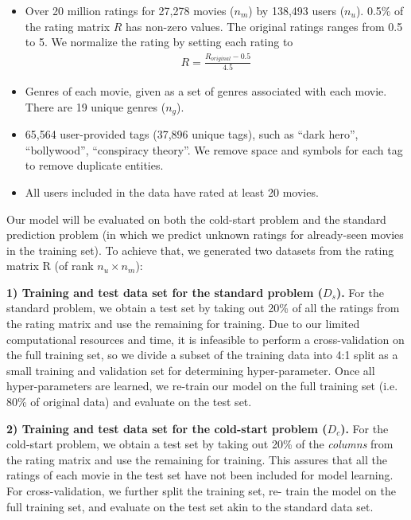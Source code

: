 \documentclass{article} %
\begin{document}
\begin{itemize}[leftmargin=15pt]
	\item Over 20 million ratings for 27,278 movies ($n_m$) by 138,493 users ($n_u$).
	0.5\% of the rating matrix $R$ has non-zero values.  The original ratings ranges from 0.5 to 5.  We normalize the rating by setting each rating to
\begin{align}
	 R = \frac{R_{original} - 0.5}{4.5}
\end{align}

	\item Genres of each movie, given as a set of genres associated with each
movie. There are 19 unique genres ($n_g$).

	\item 65,564 user-provided tags (37,896 unique tags), such as ``dark hero'', ``bollywood'',
	``conspiracy theory''.  We remove space and symbols for each tag to remove duplicate entities.

	\item All users included in the data have rated at least 20 movies.
\end{itemize}

Our model will be evaluated on both the cold-start problem and the standard
prediction problem (in which we predict unknown ratings for already-seen
movies in the training set). To achieve that, we generated two datasets from the
rating matrix R (of rank $n_u \times n_m$):

\textbf{1) Training and test data set for the standard problem ($D_s$).}
For the standard problem, we obtain a test set by taking out 20\% of all the
ratings from the rating matrix and use the remaining for training.
Due to our limited computational resources and time, it is infeasible to
perform a cross-validation on the full training set, so we divide a subset
of the training data into 4:1 split as a small training and validation set
for determining hyper-parameter.  Once all hyper-parameters are learned, we
re-train our model on the full training set (i.e. 80\% of original data) and
evaluate on the test set.

\textbf{2) Training and test data set for the cold-start problem ($D_c$).}
For the cold-start problem, we obtain a test set by taking out 20\% of   the
{\em columns} from the rating matrix and use the remaining for training. This
assures that all the ratings of each movie in the test set have not been
included for model learning.   For cross-validation, we further split the
training set, re- train the model on the full training set, and evaluate on
the test set akin to the standard data set.
\end{document}
